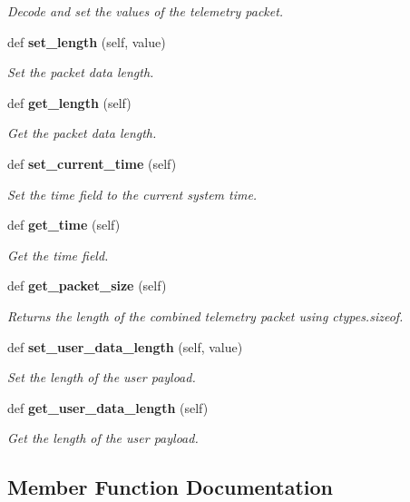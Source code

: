 \begin{DoxyCompactItemize}
\begin{DoxyCompactList}\small\item\em Decode and set the values of the telemetry packet. \end{DoxyCompactList}\item 
def {\bf set\+\_\+length} (self, value)
\begin{DoxyCompactList}\small\item\em Set the packet data length. \end{DoxyCompactList}\item 
def {\bf get\+\_\+length} (self)
\begin{DoxyCompactList}\small\item\em Get the packet data length. \end{DoxyCompactList}\item 
def {\bf set\+\_\+current\+\_\+time} (self)
\begin{DoxyCompactList}\small\item\em Set the time field to the current system time. \end{DoxyCompactList}\item 
def {\bf get\+\_\+time} (self)
\begin{DoxyCompactList}\small\item\em Get the time field. \end{DoxyCompactList}\item 
def {\bf get\+\_\+packet\+\_\+size} (self)
\begin{DoxyCompactList}\small\item\em Returns the length of the combined telemetry packet using ctypes.\+sizeof. \end{DoxyCompactList}\item 
def {\bf set\+\_\+user\+\_\+data\+\_\+length} (self, value)
\begin{DoxyCompactList}\small\item\em Set the length of the user payload. \end{DoxyCompactList}\item 
def {\bf get\+\_\+user\+\_\+data\+\_\+length} (self)
\begin{DoxyCompactList}\small\item\em Get the length of the user payload. \end{DoxyCompactList}\end{DoxyCompactItemize}


\subsection{Member Function Documentation}
